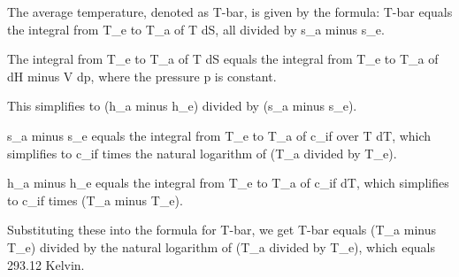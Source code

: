The average temperature, denoted as T-bar, is given by the formula:
T-bar equals the integral from T_e to T_a of T dS, all divided by s_a minus s_e.

The integral from T_e to T_a of T dS equals the integral from T_e to T_a of dH minus V dp, where the pressure p is constant.

This simplifies to (h_a minus h_e) divided by (s_a minus s_e).

s_a minus s_e equals the integral from T_e to T_a of c_if over T dT, which simplifies to c_if times the natural logarithm of (T_a divided by T_e).

h_a minus h_e equals the integral from T_e to T_a of c_if dT, which simplifies to c_if times (T_a minus T_e).

Substituting these into the formula for T-bar, we get T-bar equals (T_a minus T_e) divided by the natural logarithm of (T_a divided by T_e), which equals 293.12 Kelvin.